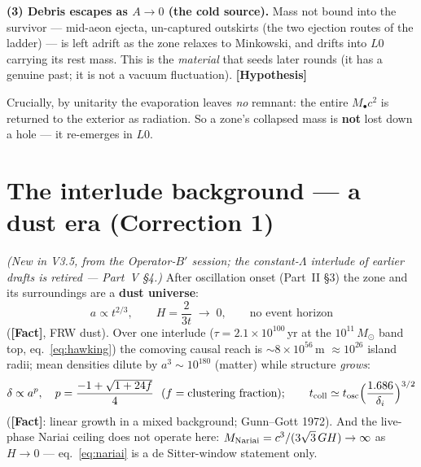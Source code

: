 \documentclass[11pt]{article}
\newcommand{\Fact}{\textbf{\textcolor{green!45!black}{[Fact]}}}
\newcommand{\Hyp}{\textbf{\textcolor{blue!55!black}{[Hypothesis]}}}
\newcommand{\msun}{M_\odot}
\newcommand{\Mbh}{M_{\bullet}}
\begin{document}
\textbf{(3) Debris escapes as $A\!\to\!0$ (the cold source).} Mass not bound into the survivor --- mid-aeon ejecta, un-captured outskirts (the two ejection routes of the ladder) --- is left adrift as the zone relaxes to Minkowski, and drifts into $L0$ carrying its rest mass. This is the \emph{material} that seeds later rounds (it has a genuine past; it is not a vacuum fluctuation). \Hyp

Crucially, by unitarity the evaporation leaves \emph{no} remnant: the entire $\Mbh c^2$ is returned to the exterior as radiation. So a zone's collapsed mass is \textbf{not} lost down a hole --- it re-emerges in $L0$.


\section{The interlude background --- a dust era (Correction 1)}
\emph{(New in V3.5, from the Operator-$B'$ session; the constant-$\Lambda$ interlude of earlier drafts is retired --- Part~V \S4.)} After oscillation onset (Part~II \S3) the zone and its surroundings are a \textbf{dust universe}:
\begin{equation}
a\propto t^{2/3},\qquad H=\frac{2}{3t}\;\to\;0,\qquad\text{no event horizon}
\label{eq:dustera}
\end{equation}
(\Fact, FRW dust). Over one interlude ($\tau=2.1\times10^{100}$\,yr at the $10^{11}\,\msun$ band top, eq.~\eqref{eq:hawking}) the comoving causal reach is $\sim8\times10^{56}$\,m $\approx10^{26}$ island radii; mean densities dilute by $a^3\sim10^{180}$ (matter) while structure \emph{grows}:
\begin{equation}
\delta\propto a^{p},\quad p=\frac{-1+\sqrt{1+24f}}{4}\ \ (f=\text{clustering fraction});\qquad
t_{\rm coll}\simeq t_{\rm osc}\Bigl(\frac{1.686}{\delta_i}\Bigr)^{3/2}
\label{eq:gunngott}
\end{equation}
(\Fact: linear growth in a mixed background; Gunn--Gott 1972). And the live-phase Nariai ceiling does not operate here: $M_{\rm Nariai}=c^3/(3\sqrt3\,GH)\to\infty$ as $H\to0$ --- eq.~\eqref{eq:nariai} is a de Sitter-window statement only.
\end{document}
